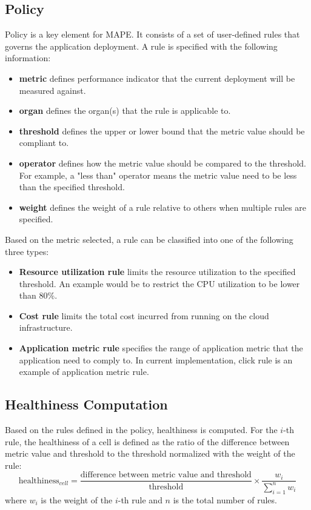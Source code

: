 \documentclass{seal_thesis}
\begin{document}
\subsection{Policy}
Policy is a key element for MAPE.
It consists of a set of user-defined rules that governs the application deployment.
A rule is specified with the following information:
\begin{itemize}
\item \textbf{metric} defines performance indicator that the current deployment will be measured against.
\item \textbf{organ} defines the organ(s) that the rule is applicable to.
\item \textbf{threshold} defines the upper or lower bound that the metric value should be compliant to.
\item \textbf{operator} defines how the metric value should be compared to the threshold.
For example, a "less than" operator means the metric value need to be less than the specified threshold.
\item \textbf{weight} defines the weight of a rule relative to others when multiple rules are specified.
\end{itemize}
Based on the metric selected, a rule can be classified into one of the following three types:
\begin{itemize}
\item \textbf{Resource utilization rule} limits the resource utilization to the specified threshold.
An example would be to restrict the CPU utilization to be lower than 80\%.
\item \textbf{Cost rule} limits the total cost incurred from running on the cloud infrastructure.
\item \textbf{Application metric rule} specifies the range of application metric that the application need to comply to.
In current implementation, click rule is an example of application metric rule.
\end{itemize}

\subsection{Healthiness Computation}
Based on the rules defined in the policy, healthiness is computed.
For the $i$-th rule, the healthiness of a cell is defined as the ratio of the difference between metric value and threshold to the threshold normalized with the weight of the rule:
\[ \textrm{healthiness}_{cell} = \frac{\textrm{difference between metric value and threshold}}{\textrm{threshold}} \times \frac{w_i}{\sum_{i=1}^{n}{w_i}}\]
where $w_i$ is the weight of the $i$-th rule and $n$ is the total number of rules.
\end{document}
